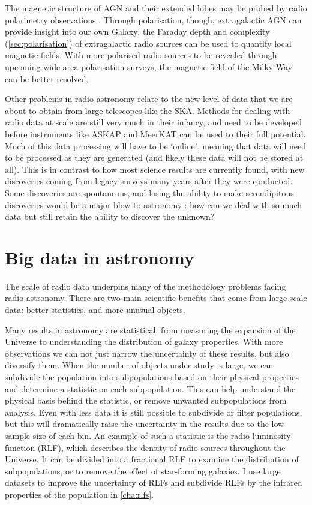     The magnetic structure of AGN and their extended lobes may be probed by radio polarimetry observations \citep{anderson_broadband_2015,grant11polarised}. Through polarisation, though, extragalactic AGN can provide insight into our own Galaxy: the Faraday depth and complexity (\autoref{sec:polarisation}) of extragalactic radio sources can be used to quantify local magnetic fields. With more polarised radio sources to be revealed through upcoming wide-area polarisation surveys, the magnetic field of the Milky Way can be better resolved.

    Other problems in radio astronomy relate to the new level of data that we are about to obtain from large telescopes like the SKA. Methods for dealing with radio data at scale are still very much in their infancy, and need to be developed before instruments like ASKAP and MeerKAT can be used to their full potential. Much of this data processing will have to be `online', meaning that data will need to be processed as they are generated (and likely these data will not be stored at all). This is in contrast to how most science results are currently found, with new discoveries coming from legacy surveys many years after they were conducted. Some discoveries are spontaneous, and losing the ability to make serendipitous discoveries would be a major blow to astronomy \citep{norris17unexpected}: how can we deal with so much data but still retain the ability to discover the unknown?

\section{Big data in astronomy}
\label{sec:big-data}

    The scale of radio data underpins many of the methodology problems facing radio astronomy. There are two main scientific benefits that come from large-scale data: better statistics, and more unusual objects.

    Many results in astronomy are statistical, from measuring the expansion of the Universe to understanding the distribution of galaxy properties. With more observations we can not just narrow the uncertainty of these results, but also diversify them. When the number of objects under study is large, we can subdivide the population into subpopulations based on their physical properties and determine a statistic on each subpopulation. This can help understand the physical basis behind the statistic, or 
    remove unwanted subpopulations from analysis. Even with less data it is still possible to subdivide or filter populations, but this will dramatically raise the uncertainty in the results due to the low sample size of each bin. An example of such a statistic is the radio luminosity function (RLF), which describes the density of radio sources throughout the Universe. It can be divided into a fractional RLF to examine the distribution of subpopulations, or to remove the effect of star-forming galaxies. I use large datasets to improve the uncertainty of RLFs and subdivide RLFs by the infrared properties of the population in \autoref{cha:rlfs}.

